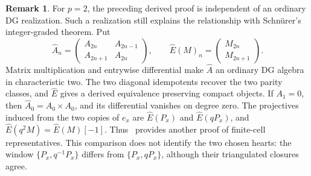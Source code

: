 \documentclass[11pt]{article}
\theoremstyle{definition}
\newtheorem{rem}[thm]{Remark}
\numberwithin{equation}{section}
\begin{document}
\begin{rem}
\label{rem:weak-grouped-comparison}
For $p=2$, the preceding derived proof is independent of an ordinary
DG realization.  Such a realization still explains the relationship
with Schn\"urer's integer-graded theorem.  Put
\begin{equation}\label{eq:weak-grouped-algebra}
 \widehat{A}_{n}
 =\begin{pmatrix}A_{2n}&A_{2n-1}\\A_{2n+1}&A_{2n}\end{pmatrix},
 \qquad
 \widehat{E}(M)_n=\begin{pmatrix}M_{2n}\\M_{2n+1}\end{pmatrix}.
\end{equation}
Matrix multiplication and entrywise differential make
$\widehat{A}$ an ordinary DG algebra in characteristic two.
The two diagonal idempotents recover the two parity classes, and
$\widehat{E}$ gives a derived equivalence preserving compact objects.
If $A_1=0$, then
$\widehat{A}_{0}=A_0\times A_0$, and its differential vanishes
on degree zero.  The projectives induced from the two copies of $e_x$
are $\widehat{E}(P_x)$ and $\widehat{E}(qP_x)$, and
$\widehat{E}(q^2M)=\widehat{E}(M)[-1]$.
Thus~\cite[Theorem~1]{SchPos} provides another proof of finite-cell
representatives.  This comparison does not identify the two chosen
hearts: the window $\{P_x,q^{-1}P_x\}$ differs from
$\{P_x,qP_x\}$, although their triangulated closures agree.
\end{rem}
\end{document}
